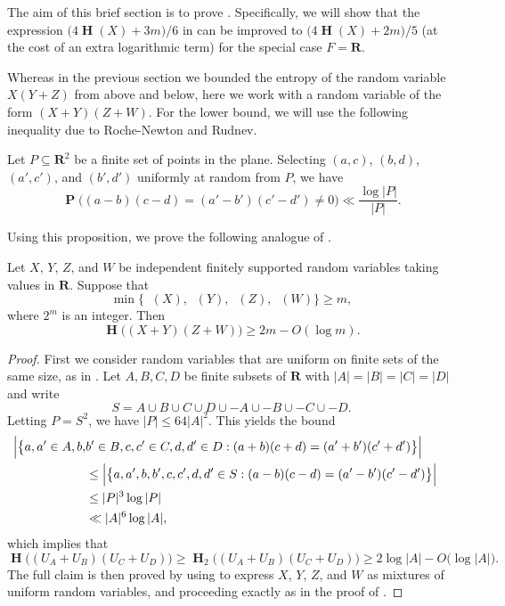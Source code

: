 \documentclass[twoside, 10pt]{article}
\DeclareMathOperator{\Eta}{\mathbf{H}}
\DeclareMathOperator{\Etamin}{\mathbf{H}_\infty}
\DeclareMathOperator{\pr}{\mathbf{P}}
\newcommand{\RR}{\mathbf{R}}   %
\begin{document}
The aim of this brief section is to prove . 
Specifically, we will show that the expression $\bigl(4\Eta(X) + 3m\bigr) / 6$ 
in  can be improved to $\bigl(4\Eta(X) + 2m\bigr)/5$ 
(at the cost of an extra logarithmic term) for the special case $F=\RR$. 

Whereas in the previous section we bounded the entropy of the random 
variable $X(Y+Z)$ from above and below, here we work with 
a random variable of the form $(X+Y)(Z+W)$. For the
lower bound, we will use the following inequality due to
Roche-Newton and Rudnev.

\begin{proposition}
\label{proproru}
Let $P\subseteq \RR^2$ be a finite set of points in the plane. Selecting $(a,c)$, $(b,d)$, $(a',c')$, and $(b',d')$ uniformly at random from $P$, we have
$$
\pr\bigl( (a-b)(c-d) = (a'-b')(c'-d')\ne 0\bigr) 
\ll \frac{\log|P|}{|P|}.
$$
\end{proposition}

Using this proposition, we prove the following 
analogue of .

\begin{lemma}\label{lemHminlowerboundreal}
Let $X$, $Y$, $Z$, and $W$ be independent finitely supported random variables taking values in $\RR$. Suppose that
$$\min\bigl\{ \Etamin(X), \Etamin(Y), \Etamin(Z), \Etamin(W)\bigr\} \ge m,$$
where $2^m$ is an integer. Then
$$\Eta\bigl( (X+Y)(Z+W)\bigr) \ge 2m - O(\log m).$$
\end{lemma}

\begin{proof}
First we consider random variables that are uniform on finite sets 
of the same size, as in .
Let $A,B,C,D$ be finite subsets of $\RR$ with
$|A| = |B| = |C| = |D|$ and write
$$S = A\cup B\cup C\cup D \cup -A \cup -B \cup -C\cup -D.$$
Letting $P = S^2$, we have $|P| \le 64|A|^2$. This yields the bound
\begin{equation}\begin{aligned}
\Bigl| \bigl\{ a,a'\in A, b,&b'\in B, c,c'\in C, d,d'\in D
: (a+b)(c+d) = (a'+b')(c'+d')\bigr\}\Bigr|\cr
&\le \Bigl| \bigl\{ a,a',b,b',c,c',d,d'\in S
: (a-b)(c-d) = (a'-b')(c'-d')\bigr\}\Bigr| \cr
&\le |P|^3 \log |P|\cr
&\ll |A|^6 \log |A|,
\end{aligned}\end{equation}
which implies that
$$\Eta\bigl( (U_A+U_B)(U_C+U_D)\bigr)\ge \Eta_2\bigl( (U_A+U_B)(U_C+U_D) \bigr)
\ge 2\log |A| - O\bigl(\log|A|\bigr).$$
The full claim is then proved by using  
to express $X$, $Y$, $Z$, and $W$ as mixtures of uniform random variables,
and proceeding exactly as in the proof of .
\end{proof}
\end{document}
